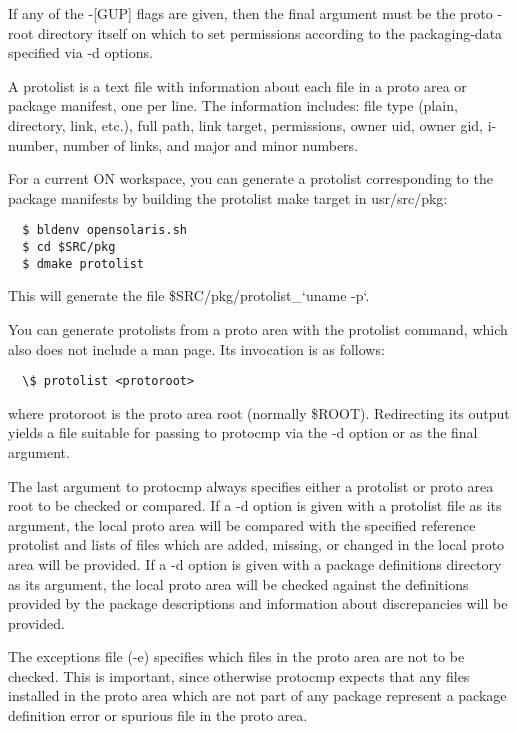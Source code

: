 \documentclass{article}
\begin{document}
If any of the -[GUP] flags are given, then the final argument must be the proto
-root directory itself on which to set permissions according to the
packaging-data specified via -d options.

A protolist is a text file with information about each file in a proto area or
package manifest, one per line. The information includes: file type (plain,
directory, link, etc.), full path, link target, permissions, owner uid, owner
gid, i-number, number of links, and major and minor numbers.

For a current ON workspace, you can generate a protolist corresponding to the
package manifests by building the protolist make target in usr/src/pkg:

\begin{verbatim}
  $ bldenv opensolaris.sh
  $ cd $SRC/pkg
  $ dmake protolist
\end{verbatim}

This will generate the file \$SRC/pkg/protolist\_`uname -p`.

You can generate protolists from a proto area with the protolist command, which
also does not include a man page. Its invocation is as follows:

\begin{verbatim}
  \$ protolist <protoroot>
\end{verbatim}

where protoroot is the proto area root (normally \$ROOT). Redirecting its output
yields a file suitable for passing to protocmp via the -d option or as the
final argument.

The last argument to protocmp always specifies either a protolist or proto area
root to be checked or compared. If a -d option is given with a protolist file
as its argument, the local proto area will be compared with the specified
reference protolist and lists of files which are added, missing, or changed in
the local proto area will be provided. If a -d option is given with a package
definitions directory as its argument, the local proto area will be checked
against the definitions provided by the package descriptions and information
about discrepancies will be provided.

The exceptions file (-e) specifies which files in the proto area are not to be
checked. This is important, since otherwise protocmp expects that any files
installed in the proto area which are not part of any package represent a
package definition error or spurious file in the proto area.
\end{document}

